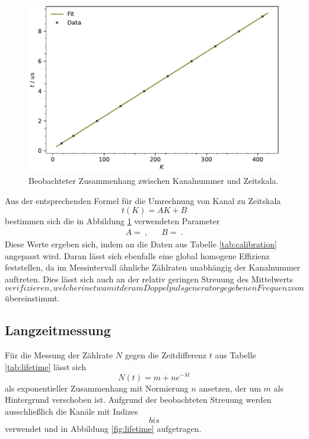\begin{figure}[H]
	\vspace{\baselineskip}
	\centering
	\includegraphics[width=\textwidth]{build/calibration.pdf}
	\caption{Beobachteter Zusammenhang zwischen Kanalnummer und Zeitskala.}
	\label{fig:calibration}
\end{figure}

Aus der entsprechenden Formel für die Umrechnung von Kanal zu Zeitskala
\begin{equation*}
	t(K) = AK + B
\end{equation*}
bestimmen sich die in Abbildung \ref{fig:calibration} verwendeten Parameter
\begin{align*}
	A =  \: , && B =  \: .
\end{align*}
Diese Werte ergeben sich, indem an die Daten aus Tabelle \ref{tab:calibration} angepasst wird. Daran lässt sich ebenfalls
eine global homogene Effizienz feststellen, da im Messintervall ähnliche Zählraten unabhängig der Kanalnummer auftreten.
Dies lässt sich auch an der relativ geringen Streuung des Mittelwerts $$ verifizieren, welcher in etwa mit
der am Doppelpulsgenerator gegebenen Frequenz von $$ übereinstimmt.



\subsection{Langzeitmessung}

Für die Messung der Zählrate $N$ gegen die Zeitdifferenz $t$ aus Tabelle \ref{tab:lifetime} lässt sich
\begin{equation*}
	N(t) = m + ne^{-\lambda t}
\end{equation*}
als exponentieller Zusammenhang mit Normierung $n$ ansetzen, der um $m$ als Hintergrund verschoben ist. Aufgrund der
beobachteten Streuung werden ausschließlich die Kanäle mit Indizes $$ bis $$
verwendet und in Abbildung \ref{fig:lifetime} aufgetragen.

